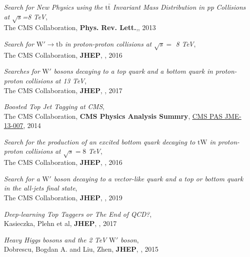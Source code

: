 \documentclass[12pt]{article}
\begin{document}
\begin{flushleft}
\begin{thebibliography}{1}


  \textit{Search for New Physics using the $\mathrm{t\bar{t}}$ Invariant Mass Distribution in pp Collisions at $\sqrt{s}$=8  TeV},\\
 The CMS Collaboration, \textbf{Phys. Rev. Lett.},{}, 2013

  \textit{Search for $\mathrm{W' \to tb}$ in proton-proton collisions at $\sqrt{s} = $ 8 TeV},\\
 The CMS Collaboration, \textbf{JHEP}, , 2016

  \textit{Searches for $\mathrm{W'}$ bosons decaying to a top quark and a bottom quark in proton-proton collisions at 13 TeV}, \\
  The CMS Collaboration, \textbf{JHEP}, , 2017



 \textit{Boosted Top Jet Tagging at CMS},\\
 The CMS Collaboration, \textbf{CMS Physics Analysis Summry}, \href{http://cms-physics.web.cern.ch/cms-physics/public/JME-13-007-pas.pdf}{{\color{blue}\underline{CMS PAS JME-13-007}}}, 2014


\textit{Search for the production of an excited bottom quark decaying to $\mathrm{tW}$ in proton-proton collisions at $ \sqrt{s}=8 $ TeV},\\
The CMS Collaboration, \textbf{JHEP}, , 2016



\textit{Search for a $\mathrm{W'}$ boson decaying to a vector-like quark and a top or bottom quark in the all-jets final state},\\
The CMS Collaboration, \textbf{JHEP}, , 2019

  \textit{Deep-learning Top Taggers or The End of QCD?},\\
 Kasieczka, Plehn et al, \textbf{JHEP}, , 2017


  \textit{Heavy Higgs bosons and the 2 TeV $\mathrm{W'}$ boson},\\
 Dobrescu, Bogdan A. and Liu, Zhen, \textbf{JHEP}, , 2015



\end{thebibliography}
\end{flushleft}
\end{document}
